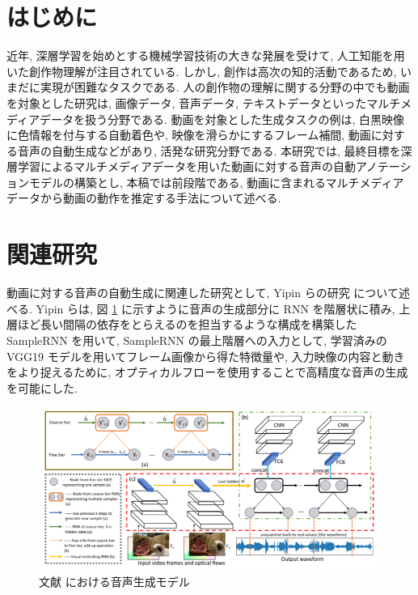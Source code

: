 \documentclass[twocolumn]{jarticle}     %
\begin{document}

\section{はじめに}
近年, 深層学習を始めとする機械学習技術の大きな発展を受けて, 人工知能を用いた創作物理解が注目されている.
しかし, 創作は高次の知的活動であるため, いまだに実現が困難なタスクである.
人の創作物の理解に関する分野の中でも動画を対象とした研究は,
画像データ, 音声データ, テキストデータといったマルチメディアデータを扱う分野である. 動画を対象とした生成タスクの例は, 白黒映像に色情報を付与する自動着色や, 映像を滑らかにするフレーム補間, 動画に対する音声の自動生成などがあり, 活発な研究分野である. 本研究では, 最終目標を深層学習によるマルチメディアデータを用いた動画に対する音声の自動アノテーションモデルの構築とし, 本稿では前段階である, 動画に含まれるマルチメディアデータから動画の動作を推定する手法について述べる.

\section{関連研究}
動画に対する音声の自動生成に関連した研究として, Yipin らの研究 \cite{DBLP:journals/corr/abs-1712-01393} について述べる. Yipin らは, 図 \ref{fig:visual_ex} に示すように音声の生成部分に RNN を階層状に積み, 上層ほど長い間隔の依存をとらえるのを担当するような構成を構築した SampleRNN を用いて, SampleRNN の最上階層への入力として, 学習済みの VGG19 モデルを用いてフレーム画像から得た特徴量や, 入力映像の内容と動きをより捉えるために, オプティカルフローを使用することで高精度な音声の生成を可能にした.

\begin{figure}[bht]
  \centering
  \includegraphics[scale=0.34]{visual_ex.png}
  \caption{文献 \cite{DBLP:journals/corr/abs-1712-01393} における音声生成モデル}
  \label{fig:visual_ex}
\end{figure}
\end{document}
